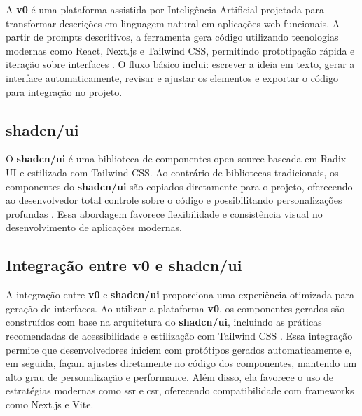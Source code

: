 A \textbf{v0} é uma plataforma assistida por Inteligência Artificial projetada para transformar descrições em linguagem natural em aplicações web funcionais. A partir de prompts descritivos, a ferramenta gera código utilizando tecnologias modernas como React, Next.js e Tailwind CSS, permitindo prototipação rápida e iteração sobre interfaces \cite{v0_docs}. O fluxo básico inclui: escrever a ideia em texto, gerar a interface automaticamente, revisar e ajustar os elementos e exportar o código para integração no projeto.

\subsection{shadcn/ui}
\label{subsec:shadcn}

O \textbf{shadcn/ui} é uma biblioteca de componentes open source baseada em Radix UI e estilizada com Tailwind CSS. Ao contrário de bibliotecas tradicionais, os componentes do \textbf{shadcn/ui} são copiados diretamente para o projeto, oferecendo ao desenvolvedor total controle sobre o código e possibilitando personalizações profundas \cite{shadcn_docs}. Essa abordagem favorece flexibilidade e consistência visual no desenvolvimento de aplicações modernas.

\subsection{Integração entre v0 e shadcn/ui}
\label{subsec:integracao-v0-shadcn}

A integração entre \textbf{v0} e \textbf{shadcn/ui} proporciona uma experiência otimizada para geração de interfaces. Ao utilizar a plataforma \textbf{v0}, os componentes gerados são construídos com base na arquitetura do \textbf{shadcn/ui}, incluindo as práticas recomendadas de acessibilidade e estilização com Tailwind CSS \cite{v0_docs, shadcn_docs}. Essa integração permite que desenvolvedores iniciem com protótipos gerados automaticamente e, em seguida, façam ajustes diretamente no código dos componentes, mantendo um alto grau de personalização e performance. Além disso, ela favorece o uso de estratégias modernas como \acrshort{ssr} e \acrshort{csr}, oferecendo compatibilidade com frameworks como Next.js e Vite.
